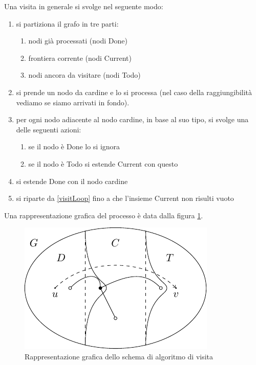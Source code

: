 Una visita in generale si svolge nel seguente modo:
\begin{enumerate}
    \item si partiziona il grafo in tre parti:
    \begin{enumerate}
        \item nodi già processati (nodi Done)
        \item frontiera corrente (nodi Current)
        \item nodi ancora da visitare (nodi Todo)
    \end{enumerate}
    \item\label{visitLoop} si prende un nodo da cardine e lo si processa (nel caso della raggiungibilità vediamo se
    siamo arrivati in fondo).
    \item per ogni nodo adiacente al nodo cardine, in base al suo tipo, si svolge una delle
    seguenti azioni:
    \begin{enumerate}
        \item se il nodo è Done lo si ignora
        \item se il nodo è Todo si estende Current con questo
    \end{enumerate}
    \item si estende Done con il nodo cardine
    \item si riparte da \ref{visitLoop} fino a che l'insieme Current non risulti vuoto
\end{enumerate}

Una rappresentazione grafica del processo è data dalla figura \ref{GraphVisit}.

\begin{figure}[h]
    \begin{center}
        \includegraphics{./img/complexity_intro/GraphVisit.pdf}
    \end{center}
    \caption{Rappresentazione grafica dello schema di algoritmo di visita}
    \label{GraphVisit}
\end{figure}

